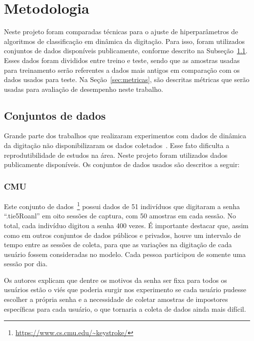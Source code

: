 \section{Metodologia}\label{sec:metodologia}

Neste projeto foram comparadas técnicas para o ajuste de hiperparâmetros de algoritmos de classificação em dinâmica da digitação. Para isso, foram utilizados conjuntos de dados disponíveis publicamente, conforme descrito na Subseção~\ref{subsec:datasets}. Esses dados foram divididos entre treino e teste, sendo que as amostras usadas para treinamento serão referentes a dados mais antigos em comparação com os dados usados para teste. Na Seção~\ref{sec:metricas}, são descritas métricas que serão usadas para avaliação de desempenho neste trabalho.


\subsection{Conjuntos de dados}\label{subsec:datasets}

Grande parte dos trabalhos que realizaram experimentos com dados de dinâmica da digitação não disponibilizaram os dados coletados~\cite{Roy2022systematic}. Esse fato dificulta a reprodutibilidade de estudos na área. Neste projeto foram utilizados dados publicamente disponíveis. Os conjuntos de dados usados são descritos a seguir:


\subsubsection{CMU}\label{subsubsec:cmu}

Este conjunto de dados~\footnote{\url{https://www.cs.cmu.edu/~keystroke/}} possui dados de 51 indivíduos que digitaram a senha ``.tie5Roanl'' em oito sessões de captura, com 50 amostras em cada sessão. No total, cada indivíduo digitou a senha 400 vezes. É importante destacar que, assim como em outros conjuntos de dados públicos e privados, houve um intervalo de tempo entre as sessões de coleta, para que as variações na digitação de cada usuário fossem consideradas no modelo. Cada pessoa participou de somente uma sessão por dia.

Os autores explicam que dentre os motivos da senha ser fixa para todos os usuários estão o viés que poderia surgir nos experimento se cada usuário pudesse escolher a própria senha e a necessidade de coletar amostras de impostores específicas para cada usuário, o que tornaria a coleta de dados ainda mais difícil.


